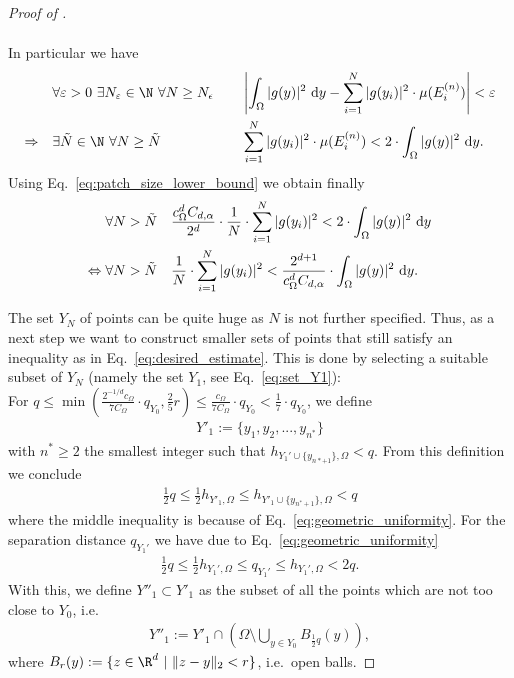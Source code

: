 \documentclass[a4paper, 10pt]{article}
\begin{document}
\begin{proof}[Proof of ]
\begin{itemize}
\begin{align*}
\end{align*}
%
%
%
In particular we have
\begin{alignat*}{2}
&\forall \varepsilon > 0 ~ \exists N_\varepsilon \in \N ~ \forall N \geq N_\epsilon && \quad \left| \int_{\Omega} |g(y)|^2 ~ \mathrm{d}y - \sum_{i=1}^N |g(y_i)|^2 \cdot \mu(E_i^{(n)}) \right| < \varepsilon \\
\Rightarrow \quad &\exists \tilde{N} \in \N ~ \forall N \geq \tilde{N}&& \quad \sum_{i=1}^N |g(y_i)|^2 \cdot \mu(E_i^{(n)}) < 2 \cdot \int_{\Omega} |g(y)|^2 ~ \mathrm{d}y.
\end{alignat*}
Using Eq.\ \eqref{eq:patch_size_lower_bound} we obtain finally
\begin{align}
\label{eq:desired_estimate}
\forall N > \tilde{N}& \quad \frac{c_\Omega^{d} C_{d, \alpha}}{2^{d}} \cdot \frac{1}{N} \cdot \sum_{i=1}^N |g(y_i)|^2 < 2 \cdot \int_{\Omega} |g(y)|^2 ~ \mathrm{d}y \notag \\
\Leftrightarrow \forall N > \tilde{N}& \quad \frac{1}{N} \cdot \sum_{i=1}^N |g(y_i)|^2 < \frac{2^{d+1}}{c_\Omega^{d} C_{d, \alpha}} \cdot \int_{\Omega} |g(y)|^2 ~ \mathrm{d}y.
\end{align}
\end{itemize}

The set $Y_N$ of points can be quite huge as $N$ is not further specified.
Thus, as a next step we want to construct smaller sets of points that still satisfy an inequality as in Eq.\ \eqref{eq:desired_estimate}.
This is done by selecting a suitable subset of $Y_N$ (namely the set $Y_1$, see Eq.~\eqref{eq:set_Y1}): \\
For $q \leq \min \left( \frac{2^{-1/d} c_\Omega}{7 C_\Omega} \cdot q_{Y_0}, \frac{2}{5}r \right) \leq \frac{c_\Omega}{7 C_\Omega} \cdot q_{Y_0} < \frac{1}{7} \cdot q_{Y_0}$, we define 
\begin{align}
\label{eq:definition_y'}
Y'_1 := \{ y_1, y_2, ..., y_{n^*}\}
\end{align}
with $n^* \geq 2$ the smallest integer such that $h_{Y_1' \cup \{ y_{n* + 1} \}, \Omega} < q$.
%
From this definition we conclude
\begin{align}
\label{eq:proof:geom_props_1}
\frac{1}{2} q \leq \frac{1}{2} h_{Y'_1, \Omega} \leq h_{Y'_1 \cup \{ y_{n^*+1} \}, \Omega} < q
\end{align}
where the middle inequality is because of Eq.~\eqref{eq:geometric_uniformity}.
For the separation distance $q_{Y_1'}$ we have due to Eq.~\eqref{eq:geometric_uniformity}
\begin{align}
\label{eq:proof:geom_props_2}
\frac{1}{2} q \leq \frac{1}{2} h_{Y_1', \Omega} \leq q_{Y_1'} \leq h_{Y_1', \Omega} < 2q.
\end{align}
With this, we define $Y''_1 \subset Y'_1$ as the subset of all the points which are not too close to $Y_0$, i.e.\
\begin{align}
\label{eq:definition_y''}
Y''_1 := Y'_1 \cap \left( \Omega \setminus \bigcup_{y \in Y_0} B_{\frac{1}{2} q}(y) \right),
\end{align}
where $B_r(y) := \{ z \in \R^d ~ | ~ \Vert z - y \Vert_2 < r \}$, i.e.\ open balls. 


\end{proof}
\end{document}
